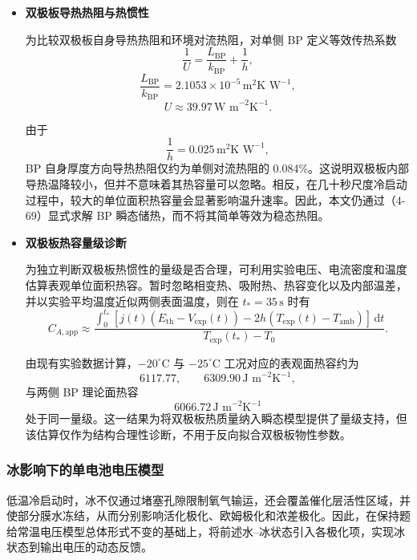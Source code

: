 \documentclass[bwprint]{gmcmthesis}
\numberwithin{figure}{section}
\begin{document}
\begin{itemize}
 若两侧表面温度近似相同，则有
\[
q_{\text{loss},A} \approx 2h(T - T_{\text{amb}}),
\]
我们不能在整体能量平衡中遗漏任意一侧环境散热。

\item \textbf {双极板导热热阻与热惯性}

为比较双极板自身导热热阻和环境对流热阻，对单侧 BP 定义等效传热系数
\[
\frac{1}{U} = \frac{L_{\text{BP}}}{k_{\text{BP}}} + \frac{1}{h},
\]
\[
\frac{L_{\text{BP}}}{k_{\text{BP}}} = 2.1053 \times 10^{-5} \, \text{m}^2\text{K W}^{-1},
\]
\begin{equation}
U \approx 39.97 \, \text{W m}^{-2}\text{K}^{-1}. \tag{4-70}
\end{equation}

 由于
\[
\frac{1}{h} = 0.025 \, \text{m}^2\text{K W}^{-1},
\]
BP 自身厚度方向导热热阻仅约为单侧对流热阻的 0.084\%。这说明双极板内部导热温降较小，但并不意味着其热容量可以忽略。相反，在几十秒尺度冷启动过程中，较大的单位面积热容量会显著影响温升速率。因此，本文仍通过（4-69）显式求解 BP 瞬态储热，而不将其简单等效为稳态热阻。


\item \textbf {双极板热容量级诊断}


为独立判断双极板热惯性的量级是否合理，可利用实验电压、电流密度和温度估算表观单位面积热容。暂时忽略相变热、吸附热、热容变化以及内部温差，并以实验平均温度近似两侧表面温度，则在 \(t_* = 35 \, \text{s}\) 时有
\begin{equation}
C_{A,\text{app}} \approx \frac{\int_0^{t_*} [j(t)(E_{\text{th}} - V_{\text{exp}}(t)) - 2h(T_{\text{exp}}(t) - T_{\text{amb}})] \, \mathrm{d}t}{T_{\text{exp}}(t_*) - T_0}. \tag{4-71}
\end{equation}

 由现有实验数据计算，\(-20^\circ\text{C}\) 与 \(-25^\circ\text{C}\) 工况对应的表观面热容约为
\[
6117.77, \qquad 6309.90 \, \text{J m}^{-2}\text{K}^{-1},
\]
与两侧 BP 理论面热容
\[
6066.72 \, \text{J m}^{-2}\text{K}^{-1}
\]
处于同一量级。这一结果为将双极板热质量纳入瞬态模型提供了量级支持，但该估算仅作为结构合理性诊断，不用于反向拟合双极板物性参数。

\end{itemize}

\subsubsection{冰影响下的单电池电压模型}
低温冷启动时，冰不仅通过堵塞孔隙限制氧气输运，还会覆盖催化层活性区域，并使部分膜水冻结，从而分别影响活化极化、欧姆极化和浓差极化。因此，在保持题给常温电压模型总体形式不变的基础上，将前述水–冰状态引入各极化项，实现冰状态到输出电压的动态反馈。
\end{document}
